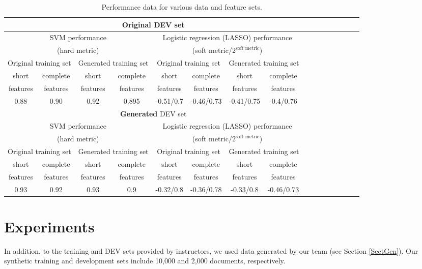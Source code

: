 \documentclass[11pt]{article}
\begin{document}
\begin{table}
\caption{\label{TablePerf}  Performance data for various data and feature sets.}
\begin{tabular}{c|c|c|c|c|c|c|c|c|c|c|c|c|c|c|c}\hline
\multicolumn{8}{c}{\textbf{Original} DEV set} \\\hline\hline
\multicolumn{4}{c|}{SVM performance } & \multicolumn{4}{c}{Logistic regression (LASSO) performance } \\
\multicolumn{4}{c|}{(hard metric)} & \multicolumn{4}{c}{(soft metric/$2^{\mbox{soft metric}}$)} \\\hline\hline
\multicolumn{2}{c|}{Original training set} & \multicolumn{2}{c|}{Generated training set}
&
\multicolumn{2}{c|}{Original training set} & \multicolumn{2}{c}{Generated training set}
\\\hline
short & complete & short & complete  &
short & complete & short & complete  \\
features & features & features & features &
features & features & features & features \\\hline
0.88  & 0.90 & 0.92 &  0.895  & -0.51/0.7 & -0.46/0.73 & -0.41/0.75 & -0.4/0.76

\\\hline
\multicolumn{8}{c}{\textbf{Generated} DEV set} \\\hline\hline
\multicolumn{4}{c|}{SVM performance } & \multicolumn{4}{c}{Logistic regression (LASSO) performance } \\
\multicolumn{4}{c|}{(hard metric)} & \multicolumn{4}{c}{(soft metric/$2^{\mbox{soft metric}}$)} \\\hline\hline
\multicolumn{2}{c|}{Original training set} & \multicolumn{2}{c|}{Generated training set} &
\multicolumn{2}{c|}{Original training set} & \multicolumn{2}{c}{Generated training set} \\\hline
short & complete & short & complete  &
short & complete & short & complete  \\
features & features & features & features &
features & features & features & features \\\hline
0.93 & 0.92   & 0.93 & 0.9  & -0.32/0.8  & -0.36/0.78 & -0.33/0.8 & -0.46/0.73\\\hline
\end{tabular}
\end{table}

\section{Experiments}
In addition, to the training and DEV sets provided by instructors,
we used data generated by our team (see Section \ref{SectGen}).
Our synthetic training and development sets include 10,000 and 2,000 documents, respectively.
\end{document}
